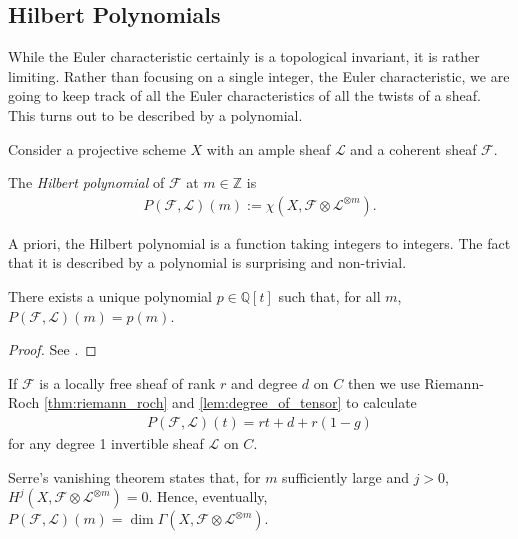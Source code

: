\documentclass[12pt]{ociamthesis}  %
\begin{document}
\subsection{Hilbert Polynomials}

While the Euler characteristic certainly is a topological invariant,
it is rather limiting. Rather than focusing on a single integer,
the Euler characteristic,
we are going to keep track of all the Euler characteristics of all
the twists of a sheaf. This turns out to be described by a polynomial.

Consider a projective scheme $X$ with an ample sheaf $\mathscr L$
and a coherent sheaf $\mathscr F$.

\begin{definition}
  The \emph{Hilbert polynomial} of $\mathscr F$ at $m\in\mathbb{Z}$
  is
  \begin{align*}
    P(\mathscr F,\mathscr L)(m) := \chi(X,\mathscr F \otimes \mathscr L^{\otimes m}).
  \end{align*}
\end{definition}

A priori, the Hilbert polynomial is a function taking integers to
integers. The fact that it is described by a polynomial is
surprising and non-trivial.

\begin{lemma}
  There exists a unique polynomial $p\in\mathbb{Q}[t]$ such that,
  for all $m$, $P(\mathscr F,\mathscr L)(m) = p(m)$.
  \begin{proof}
    See \cite[Lemma 1.2.1]{huybrechts2010}.
  \end{proof}
\end{lemma}

\begin{example}\label{ex:hilbert_polynomial}
  If $\mathscr F$ is a locally free sheaf of rank $r$ and degree $d$
  on $C$ then we use Riemann-Roch \ref{thm:riemann_roch} and
  \ref{lem:degree_of_tensor} to calculate
  \begin{align*}
    P(\mathscr F, \mathscr L)(t) = rt + d + r(1-g)
  \end{align*}
  for any degree 1 invertible sheaf $\mathscr L$ on $C$.
\end{example}

Serre's vanishing theorem \missingcitation states that,
for $m$ sufficiently large and $j>0$,
$H^j(X,\mathscr F\otimes\mathscr L^{\otimes m})=0$. Hence,
eventually,
$P(\mathscr F,\mathscr L)(m) = \dim \Gamma(X,\mathscr F\otimes \mathscr L^{\otimes m})$.
\end{document}
